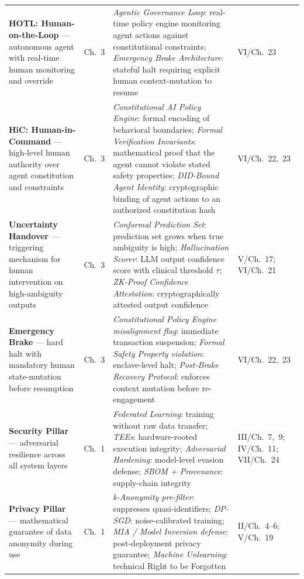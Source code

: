 \begin{longtable}{p{3.5cm} p{1.8cm} p{5.5cm} p{1.5cm}}
\textbf{HOTL: Human-on-the-Loop} --- autonomous agent with real-time human monitoring and override &
Ch.~3 &
\textit{Agentic Governance Loop}: real-time policy engine monitoring agent actions against constitutional constraints; \textit{Emergency Brake Architecture}: stateful halt requiring explicit human context-mutation to resume &
VI/Ch.~23 \\[4pt]

\textbf{HiC: Human-in-Command} --- high-level human authority over agent constitution and constraints &
Ch.~3 &
\textit{Constitutional AI Policy Engine}: formal encoding of behavioral boundaries; \textit{Formal Verification Invariants}: mathematical proof that the agent cannot violate stated safety properties; \textit{DID-Bound Agent Identity}: cryptographic binding of agent actions to an authorized constitution hash &
VI/Ch.~22,~23 \\[4pt]

\textbf{Uncertainty Handover} --- triggering mechanism for human intervention on high-ambiguity outputs &
Ch.~3 &
\textit{Conformal Prediction Set}: prediction set grows when true ambiguity is high; \textit{Hallucination Scorer}: LLM output confidence score with clinical threshold $\tau$; \textit{ZK-Proof Confidence Attestation}: cryptographically attested output confidence &
V/Ch.~17; VI/Ch.~21 \\[4pt]

\textbf{Emergency Brake} --- hard halt with mandatory human state-mutation before resumption &
Ch.~3 &
\textit{Constitutional Policy Engine misalignment flag}: immediate transaction suspension; \textit{Formal Safety Property violation}: enclave-level halt; \textit{Post-Brake Recovery Protocol}: enforces context mutation before re-engagement &
VI/Ch.~22,~23 \\[4pt]

\textbf{Security Pillar} --- adversarial resilience across all system layers &
Ch.~1 &
\textit{Federated Learning}: training without raw data transfer; \textit{TEEs}: hardware-rooted execution integrity; \textit{Adversarial Hardening}: model-level evasion defense; \textit{SBOM + Provenance}: supply-chain integrity &
III/Ch.~7,~9; IV/Ch.~11; VII/Ch.~24 \\[4pt]

\textbf{Privacy Pillar} --- mathematical guarantee of data anonymity during use &
Ch.~1 &
\textit{k-Anonymity pre-filter}: suppresses quasi-identifiers; \textit{DP-SGD}: noise-calibrated training; \textit{MIA / Model Inversion defense}: post-deployment privacy guarantee; \textit{Machine Unlearning}: technical Right to be Forgotten &
II/Ch.~4--6; V/Ch.~19 \\[4pt]


\end{longtable}
